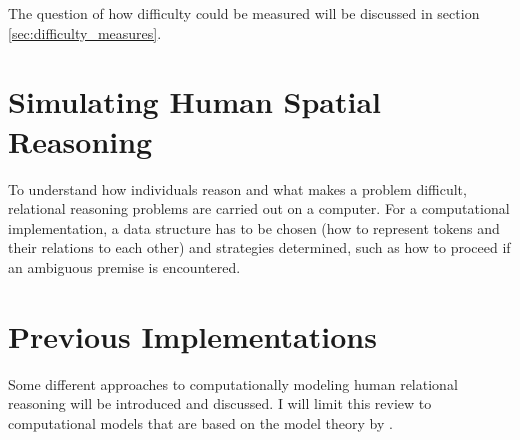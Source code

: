 \documentclass[hidelinks]{scrartcl}
\begin{document}
The question of how difficulty could be measured will be discussed in section \ref{sec:difficulty_measures}.

\section{Simulating Human Spatial Reasoning}
To understand how individuals reason and what makes a problem difficult, relational reasoning problems are carried out on a computer. For a computational implementation, a data structure has to be chosen (how to represent \gls{token}s and their relations to each other) and strategies determined, such as how to proceed if an ambiguous \gls{premise} is encountered.

\section{Previous Implementations}
Some different approaches to computationally modeling human relational reasoning will be introduced and discussed. I will limit this review to computational models that are based on the model theory by \cite{Goodwin.2005}.
\end{document}
